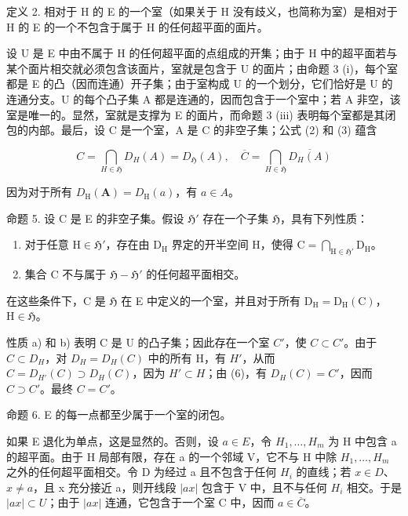 定义 2. 相对于 H 的 E 的一个室（如果关于 H 没有歧义，也简称为室）是相对于 H 的 E 的一个不包含于属于 H 的任何超平面的面片。

设 U 是 E 中由不属于 H 的任何超平面的点组成的开集；由于 H 中的超平面若与某个面片相交就必须包含该面片，室就是包含于 U 的面片；由命题 3 (i)，每个室都是 E 的凸（因而连通）开子集；由于室构成 U 的一个划分，它们恰好是 U 的连通分支。U 的每个凸子集 A 都是连通的，因而包含于一个室中；若 A 非空，该室是唯一的。显然，室就是支撑为 E 的面片，而命题 3 (iii) 表明每个室都是其闭包的内部。最后，设 C 是一个室，A 是 C 的非空子集；公式 (2) 和 (3) 蕴含

\[
C = \bigcap_ {H \in \mathfrak {H}} D _ {H} (A) = D _ {\mathfrak {H}} (A), \quad \overline {{C}} = \bigcap_ {H \in \mathfrak {H}} \overline {{D _ {H} (A)}}\tag{6}
\]

因为对于所有 \(D_{\mathrm{H}}(\mathbf{A}) = D_{\mathrm{H}}(a)\)，有 \(a \in A\)。

命题 5. 设 C 是 E 的非空子集。假设 \(\mathfrak{H}'\) 存在一个子集 \(\mathfrak{H}\)，具有下列性质：

\begin{enumerate}
\def\labelenumi{\alph{enumi})}
\item
  对于任意 \(\mathrm{H} \in \mathfrak{H}'\)，存在由 \(\mathrm{D}_{\mathrm{H}}\) 界定的开半空间 \(\mathrm{H}\)，使得 \(\mathrm{C} = \bigcap_{\mathrm{H} \in \mathfrak{H}'} \mathrm{D}_{\mathrm{H}}\)。
\item
  集合 C 不与属于 \(\mathfrak{H} - \mathfrak{H}'\) 的任何超平面相交。
\end{enumerate}

在这些条件下，C 是 \(\mathfrak{H}\) 在 E 中定义的一个室，并且对于所有 \(\mathrm{D_H} = \mathrm{D_H(C)}\)，\(\mathrm{H} \in \mathfrak{H}\)。

性质 a) 和 b) 表明 C 是 U 的凸子集；因此存在一个室 \(C'\)，使 \(C \subset C'\)。由于 \(C \subset D_{H}\)，对 \(D_{H} = D_{H}(C)\) 中的所有 H，有 \(H'\)，从而 \(C = D_{H'}(C) \supset D_{H}(C)\)，因为 \(H' \subset H\)；由 (6)，有 \(D_{H}(C) = C'\)，因而 \(C \supset C'\)。最终 \(C = C'\)。

命题 6. E 的每一点都至少属于一个室的闭包。

如果 E 退化为单点，这是显然的。否则，设 \(a \in E\)，令 \(H_{1}, \ldots, H_{m}\) 为 H 中包含 a 的超平面。由于 H 局部有限，存在 a 的一个邻域 V，它不与 H 中除 \(H_{1}, \ldots, H_{m}\) 之外的任何超平面相交。令 D 为经过 a 且不包含于任何 \(H_{i}\) 的直线；若 \(x \in D\)、\(x \neq a\)，且 x 充分接近 a，则开线段 \(|ax|\) 包含于 V 中，且不与任何 \(H_{i}\) 相交。于是 \(|ax| \subset U\)；由于 \(|ax|\) 连通，它包含于一个室 C 中，因而 \(a \in \overline{C}\)。

